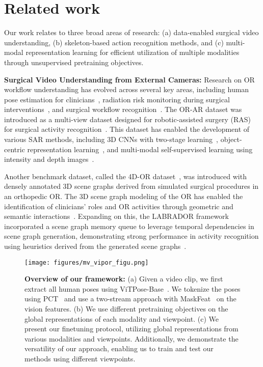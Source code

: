 \section{Related work}
Our work relates to three broad areas of research: (a) data-enabled surgical video understanding, (b) skeleton-based action recognition methods, and (c) multi-modal representation learning for efficient utilization of multiple modalities through unsupervised pretraining objectives. 

\noindent \textbf{Surgical Video Understanding from External Cameras: } Research on OR workflow understanding has evolved across several key areas, including human pose estimation for clinicians~\citep{MVORVinkle,srivastav2020self}, radiation risk monitoring during surgical interventions~\citep{rodas2016see,Ladikos2010EstimatingRE}, and surgical workflow recognition~\citep{zhang2021real,Twinanda2017MultiStreamDA,MoreThan}. The OR-AR dataset was introduced as a multi-view dataset designed for robotic-assisted surgery (RAS) for surgical activity recognition~\citep{Sharghi2020}. This dataset has enabled the development of various SAR methods, including 3D CNNs with two-stage learning~\citep{Sharghi2020}, object-centric representation learning~\citep{hamoud24a}, and multi-modal self-supervised learning using intensity and depth images~\citep{Jamal-ISI}.

Another benchmark dataset, called the 4D-OR dataset~\citep{4DOR}, was introduced with densely annotated 3D scene graphs derived from simulated surgical procedures in an orthopedic OR. The 3D scene graph modeling of the OR has enabled the identification of clinicians' roles and OR activities through geometric and semantic interactions~\citep{4DOR}. Expanding on this, the LABRADOR framework incorporated a scene graph memory queue to leverage temporal dependencies in scene graph generation, demonstrating strong performance in activity recognition using heuristics derived from the generated scene graphs~\citep{Labrador,Ege_IJCARS}.

\begin{figure*}[t!]
    \centering
    \texttt{[image: figures/mv\_vipor\_figu.png]}
    \caption{\textbf{Overview of our framework:} (a) Given a video clip, we first extract all human poses using ViTPose-Base~\citep{vitpose}. We tokenize the poses using PCT~\citep{PCT} and use a two-stream approach with MaskFeat~\citep{MaskFeat} on the vision features. (b) We use different pretraining objectives on the global representations of each modality and viewpoint. (c) We present our finetuning protocol, utilizing global representations from various modalities and viewpoints. Additionally, we demonstrate the versatility of our approach, enabling us to train and test our methods using different viewpoints.}
    \label{fig:enter-label}
\end{figure*}

